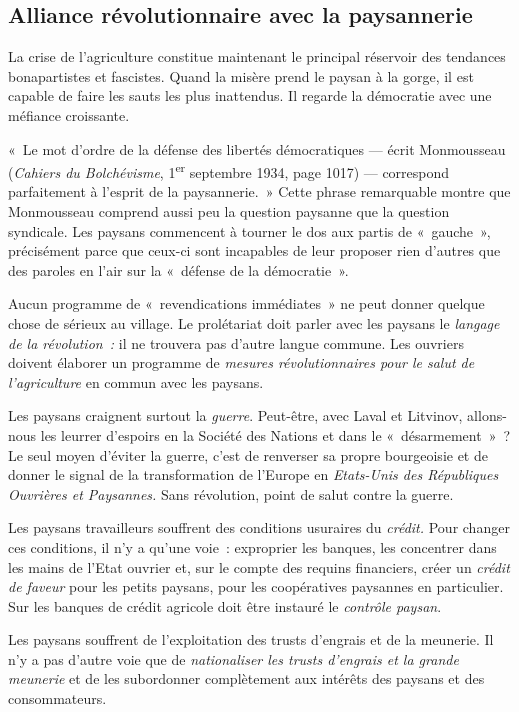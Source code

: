 \documentclass[french,twoside]{book} %
\begin{document}
\subsection[{Alliance révolutionnaire avec la paysannerie}]{Alliance révolutionnaire avec la paysannerie}
\noindent La crise de l’agriculture constitue maintenant le principal réservoir des tendances bonapartistes et fascistes. Quand la misère prend le paysan à la gorge, il est capable de faire les sauts les plus inattendus. Il regarde la démocratie avec une méfiance croissante.\par
« Le mot d’ordre de la défense des libertés démocratiques — écrit Monmousseau (\emph{Cahiers du Bolchévisme}, 1\textsuperscript{er} septembre 1934, page 1017) — correspond parfaitement à l’esprit de la paysannerie. » Cette phrase remarquable montre que Monmousseau comprend aussi peu la question paysanne que la question syndicale. Les paysans commencent à tourner le dos aux partis de « gauche », précisément parce que ceux-ci sont incapables de leur proposer rien d’autres que des paroles en l’air sur la « défense de la démocratie ».\par
 Aucun programme de « revendications immédiates » ne peut donner quelque chose de sérieux au village. Le prolétariat doit parler avec les paysans le \emph{langage de la révolution :} il ne trouvera pas d’autre langue commune. Les ouvriers doivent élaborer un programme de \emph{mesures révolutionnaires pour le salut de l’agriculture} en commun avec les paysans.\par
Les paysans craignent surtout la \emph{guerre}. Peut-être, avec Laval et Litvinov, allons-nous les leurrer d’espoirs en la Société des Nations et dans le « désarmement » ? Le seul moyen d’éviter la guerre, c’est de renverser sa propre bourgeoisie et de donner le signal de la transformation de l’Europe en \emph{Etats-Unis des Républiques Ouvrières et Paysannes.} Sans révolution, point de salut contre la guerre.\par
Les paysans travailleurs souffrent des conditions usuraires du \emph{crédit.} Pour changer ces conditions, il n’y a qu’une voie : exproprier les banques, les concentrer dans les mains de l’Etat ouvrier et, sur le compte des requins financiers, créer un \emph{crédit de faveur} pour les petits paysans, pour les coopératives paysannes en particulier. Sur les banques de crédit agricole doit être instauré le \emph{contrôle paysan}.\par
Les paysans souffrent de l’exploitation des trusts d’engrais et de la meunerie. Il n’y a pas d’autre voie que de \emph{nationaliser les trusts d’engrais et la grande meunerie} et de les subordonner complètement aux intérêts des paysans et des consommateurs.\par
\end{document}
